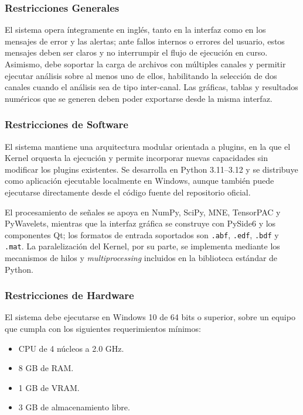 \documentclass[12pt,letterpaper,oneside]{article}
\begin{document}
\subsubsection{Restricciones Generales}

El sistema opera íntegramente en inglés, tanto en la interfaz como en los mensajes de error y las alertas; ante fallos internos o errores del usuario, estos mensajes deben ser claros y no interrumpir el flujo de ejecución en curso. Asimismo, debe soportar la carga de archivos con múltiples canales y permitir ejecutar análisis sobre al menos uno de ellos, habilitando la selección de dos canales cuando el análisis sea de tipo inter-canal. Las gráficas, tablas y resultados numéricos que se generen deben poder exportarse desde la misma interfaz.

\subsubsection{Restricciones de Software}

El sistema mantiene una arquitectura modular orientada a plugins, en la que el Kernel orquesta la ejecución y permite incorporar nuevas capacidades sin modificar los plugins existentes. Se desarrolla en Python 3.11--3.12 y se distribuye como aplicación ejecutable localmente en Windows, aunque también puede ejecutarse directamente desde el código fuente del repositorio oficial.

El procesamiento de señales se apoya en NumPy, SciPy, MNE, TensorPAC y PyWavelets, mientras que la interfaz gráfica se construye con PySide6 y los componentes Qt; los formatos de entrada soportados son \texttt{.abf}, \texttt{.edf}, \texttt{.bdf} y \texttt{.mat}. La paralelización del Kernel, por su parte, se implementa mediante los mecanismos de hilos y \textit{multiprocessing} incluidos en la biblioteca estándar de Python.

\subsubsection{Restricciones de Hardware}

El sistema debe ejecutarse en Windows 10 de 64 bits o superior, sobre un equipo que cumpla con los siguientes requerimientos mínimos:

\begin{itemize}
    \item CPU de 4 núcleos a 2.0 GHz.
    \item 8 GB de RAM.
    \item 1 GB de VRAM.
    \item 3 GB de almacenamiento libre.
\end{itemize}
\end{document}
